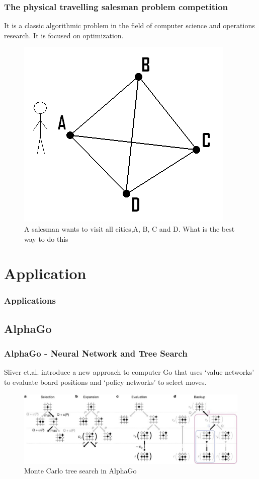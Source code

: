 \documentclass{beamer}
\begin{document}
\begin{frame}
  \frametitle{The physical travelling salesman problem competition\cite{4}}
  It is a classic algorithmic problem in the field of computer science and operations research. It is focused on optimization.
  \begin{figure}
    \includegraphics[width=0.6\linewidth]{figures/Salesman}
    \caption{A salesman wants to visit all cities,A, B, C and D. What is the best way to do this}
  \end{figure}
\end{frame}

\section{Application}

\begin{frame}
  \frametitle{Applications}

  

\end{frame}
\subsection{AlphaGo}
\begin{frame}
  \frametitle{AlphaGo - Neural Network and Tree Search}
  Sliver et.al. \cite{5} introduce a new approach to computer Go that uses ‘value networks’ to evaluate board positions and ‘policy networks’ to select moves.
  \begin{figure}
    \includegraphics[width=1\linewidth]{figures/gosearch}
    \caption{ Monte Carlo tree search in AlphaGo}
  \end{figure}
\end{frame}
\end{document}
